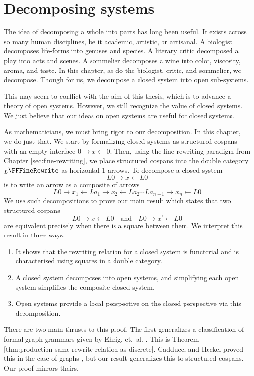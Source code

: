 \chapter{Decomposing systems}
\label{sec:structural-induction}

The idea of decomposing a whole into parts has long been
useful. It exists across so many human disciplines, be it
academic, artistic, or artisanal. A biologist decomposes
life-forms into genuses and species. A literary critic
decomposed a play into acts and scenes. A sommelier
decomposes a wine into color, viscosity, aroma, and
taste. In this chapter, as do the biologist, critic, and
sommelier, we decompose. Though for us, we decompose a
closed system into open sub-systems.

This may seem to conflict with the aim of this thesis, which
is to advance a theory of open systems. However, we still
recognize the value of closed systems. We just believe that
our ideas on open systems are useful for closed systems.

As mathematicians, we must bring rigor to our
decomposition. In this chapter, we do just that. We start
by formalizing closed systems as structured cospans with an
empty interface $ 0 \to x \gets 0 $. Then,
using the fine rewriting paradigm from Chapter
\ref{sec:fine-rewriting}, we place structured cospans into
the double category $ _L \FFFineRewrite $ as horizontal
1-arrows.  To decompose a closed system
\[
  L0 \to x \gets L0
\]
is to write an arrow as a composite of arrows
\[
  L0 \to x_1 \gets La_1 \to x_2 \gets La_2
  \dotsm La_{n-1} \to x_n \gets L0
\]
We use such decompositions to prove our main result which states that two structured cospans
\[
  L0 \to x \gets L0
  \quad \text{and} \quad
  L0 \to x' \gets L0
\]
are equivalent precisely when there is a square between
them.  We interpret this result in three ways.

\begin{enumerate}
\item It shows that the rewriting relation for a closed system
  is functorial and is characterized using squares in a double
  category.
\item A closed system decomposes into open systems, and
  simplifying each open system simplifies the composite
  closed system.  
\item Open systems provide a local perspective on the closed
  perspective via this decomposition.
\end{enumerate}

There are two main thrusts to this proof.  The first
generalizes a classification of formal graph grammars given
by Ehrig, et.~al. \cite{ehrig_graph-grammars}. This is
Theorem \ref{thm:production-same-rewrite-relation-as-discrete}.
Gadducci and Heckel proved this in the case of graphs
\cite{gadducci_ind-graph-transf}, but our result generalizes
this to structured cospans. Our proof mirrors theirs.



